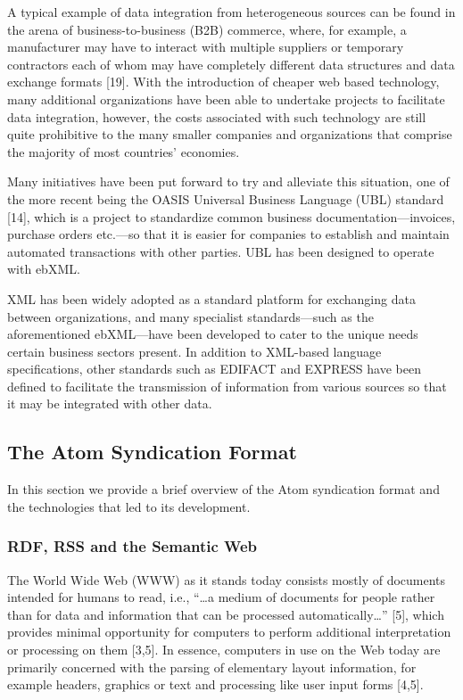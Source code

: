 \documentclass{CRPITStyle}
\begin{document}
A typical example of data integration from heterogeneous sources can be
found in the arena of business-to-business (B2B) commerce, where, for
example, a manufacturer may have to interact with multiple suppliers or
temporary contractors each of whom may have completely different data
structures and data exchange formats [19]. With the introduction of
cheaper web based technology, many additional organizations have been
able to undertake projects to facilitate data integration, however, the
costs associated with such technology are still quite prohibitive to the
many smaller companies and organizations that comprise the majority of
most countries' economies.

Many initiatives have been put forward to try and alleviate this
situation, one of the more recent being the OASIS Universal Business
Language (UBL) standard [14], which is a project to standardize common
business documentation---invoices, purchase orders etc.---so that it is
easier for companies to establish and maintain automated transactions
with other parties. UBL has been designed to operate with ebXML.

XML has been widely adopted as a standard platform for exchanging data
between organizations, and many specialist standards---such as the
aforementioned ebXML---have been developed to cater to the unique needs
certain business sectors present. In addition to XML-based language
specifications, other standards such as EDIFACT  and EXPRESS have been
defined to facilitate the transmission of information from various
sources so that it may be integrated with other data.

\subsection{The Atom Syndication Format}

In this section we provide a brief overview of the Atom syndication
format and the technologies that led to its development.

\subsubsection{RDF, RSS and the Semantic Web}

The World Wide Web (WWW) as it stands today consists mostly of documents
intended for humans to read, i.e., ``\ldots{}a medium of documents for people
rather than for data and information that can be processed
automatically\ldots'' [5], which provides minimal opportunity for computers to
perform additional interpretation or processing on them [3,5]. In
essence, computers in use on the Web today are primarily concerned with
the parsing of elementary layout information, for example headers,
graphics or text and processing like user input forms [4,5].
\end{document}
